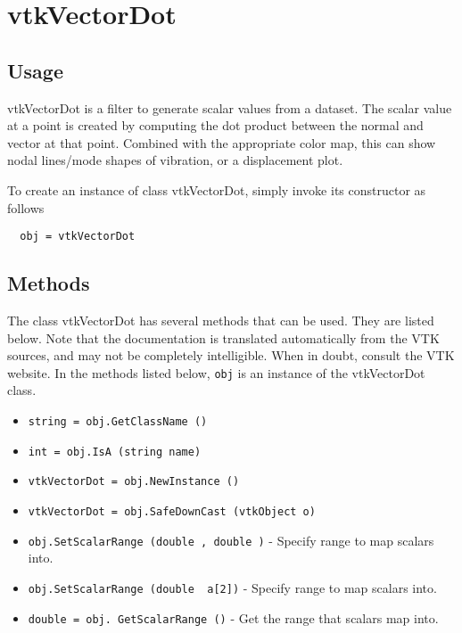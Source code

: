 \section{vtkVectorDot}

\subsection{Usage}

 vtkVectorDot is a filter to generate scalar values from a dataset.
 The scalar value at a point is created by computing the dot product 
 between the normal and vector at that point. Combined with the appropriate
 color map, this can show nodal lines/mode shapes of vibration, or a 
 displacement plot.

To create an instance of class vtkVectorDot, simply
invoke its constructor as follows
\begin{verbatim}
  obj = vtkVectorDot
\end{verbatim}
\subsection{Methods}

The class vtkVectorDot has several methods that can be used.
  They are listed below.
Note that the documentation is translated automatically from the VTK sources,
and may not be completely intelligible.  When in doubt, consult the VTK website.
In the methods listed below, \verb|obj| is an instance of the vtkVectorDot class.
\begin{itemize}
\item  \verb|string = obj.GetClassName ()|

\item  \verb|int = obj.IsA (string name)|

\item  \verb|vtkVectorDot = obj.NewInstance ()|

\item  \verb|vtkVectorDot = obj.SafeDownCast (vtkObject o)|

\item  \verb|obj.SetScalarRange (double , double )| -  Specify range to map scalars into.

\item  \verb|obj.SetScalarRange (double  a[2])| -  Specify range to map scalars into.

\item  \verb|double = obj. GetScalarRange ()| -  Get the range that scalars map into.

\end{itemize}
